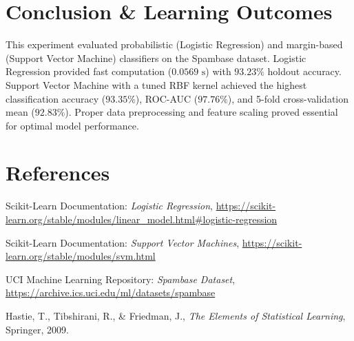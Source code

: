 \documentclass[12pt,a4paper]{article}
\begin{document}
\section{Conclusion \& Learning Outcomes}
This experiment evaluated probabilistic (Logistic Regression) and margin-based (Support Vector Machine) classifiers on the Spambase dataset. Logistic Regression provided fast computation ($0.0569\text{ s}$) with $93.23\%$ holdout accuracy. Support Vector Machine with a tuned RBF kernel achieved the highest classification accuracy ($93.35\%$), ROC-AUC ($97.76\%$), and 5-fold cross-validation mean ($92.83\%$). Proper data preprocessing and feature scaling proved essential for optimal model performance.

\section{References}
\begin{enumerate}[label={[\arabic*]},noitemsep]
    \item Scikit-Learn Documentation: \textit{Logistic Regression}, \url{https://scikit-learn.org/stable/modules/linear_model.html#logistic-regression}
    \item Scikit-Learn Documentation: \textit{Support Vector Machines}, \url{https://scikit-learn.org/stable/modules/svm.html}
    \item UCI Machine Learning Repository: \textit{Spambase Dataset}, \url{https://archive.ics.uci.edu/ml/datasets/spambase}
    \item Hastie, T., Tibshirani, R., \& Friedman, J., \textit{The Elements of Statistical Learning}, Springer, 2009.
\end{enumerate}
\end{document}
